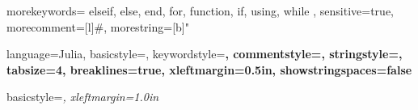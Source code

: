\usepackage{listings}

{
	morekeywords={
		elseif, else, end, for, function, if, using, while
	},
	sensitive=true,      %
	morecomment=[l]{\#}, %
	morestring=[b]"
}


{
	language=Julia,
	basicstyle=\ttfamily,
	keywordstyle=\bfseries\color{blue},
	commentstyle=\color{ForestGreen},
	stringstyle=\color{magenta},
	tabsize=4,
	breaklines=true,
	xleftmargin=0.5in,
	showstringspaces=false %
}

{
	basicstyle=\itshape,
	xleftmargin=1.0in
}
